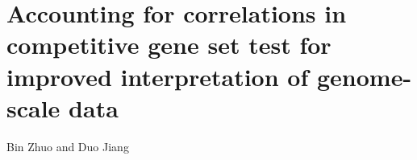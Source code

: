 \section{Accounting for correlations in competitive gene set
	test for improved interpretation of genome-scale data}\label{chap3}

\vspace*{5cm}
\begin{centering}
	{\normalsize Bin Zhuo and Duo Jiang}\\[.04\textheight]
\end{centering}	
\vspace*{5cm}

\newpage


	\begin{abstract}
	Competitive gene-set test is a widely used tool for interpreting high-throughput biological 
	data, such as gene expression and proteomics data. It aims at testing categories of genes for 
	enriched association signals in a list of genes inferred from genome-wide data. Most 
	conventional enrichment testing methods ignore or do not properly account for the widespread 
	correlations among genes, which, as we show, can result in inflated type I error rates and 
	power loss. We propose a new framework, \OurMethod, for gene set test based on a mixed effects 
	quasi-likelihood model, where the data are not required to be Gaussian. Our method effectively 
	adjusts for completely unknown,	unstructured correlations among the genes. It uses a score test 
	approach and allows for analytical assessment of $p$-values. Compared to existing methods such 
	as GSEA and CAMERA, our method enjoys robust and substantially improved control over type 1 
	error and maintains good power in a variety of correlation structure and association settings. 
	We also present two real data analysis to illustrate our approach.
	\end{abstract}
	
	
